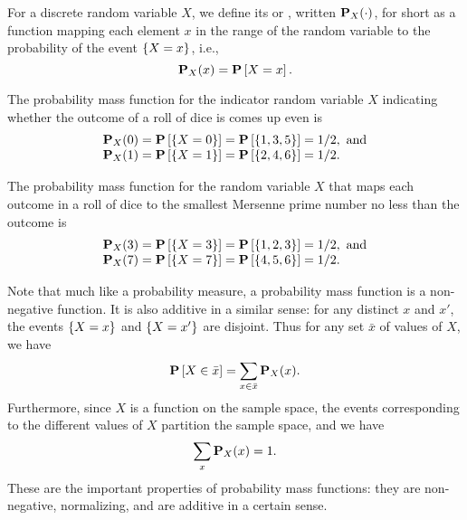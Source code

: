 \begin{flex}
\begin{definition}
For a discrete random variable $X$, we define its  or , written $\mathbf{P}_{X}(\cdot)$, for short as
a function mapping each element $x$ in the range of the random
variable to the probability of the event $\{X =x\}$, i.e.,
\[
\mathbf{P}_{X}(x) = \mathbf{P}\left[{X = x}\right].
\]
\end{definition}

\begin{example}
The probability mass function for the indicator random variable $X$
indicating whether the outcome of a roll of dice is comes up even is 
\[
\begin{array}{lll}
\mathbf{P}_{X}(0) = \mathbf{P}\left[{\{X =0\}}\right] = \mathbf{P}\left[{\{1, 3, 5\}}\right] =
1/2,~\mbox{and}
\\
\mathbf{P}_{X}(1) = \mathbf{P}\left[{\{X =1\}}\right] = \mathbf{P}\left[{\{2, 4, 6\}}\right] =
1/2.
\end{array}
\]

The probability mass function for the random variable $X$
that maps each outcome in a roll of dice to the smallest Mersenne
prime number no less than the outcome is
\[
\begin{array}{lll}
\mathbf{P}_{X}(3) = \mathbf{P}\left[{\{X =3\}}\right] = \mathbf{P}\left[{\{1, 2, 3\}}\right] =
1/2,~\mbox{and}
\\
\mathbf{P}_{X}(7) = \mathbf{P}\left[{\{X =7\}}\right] = \mathbf{P}\left[{\{4, 5, 6\}}\right] =
1/2.
\end{array}
\]
\end{example}
\end{flex}

\begin{gram}
Note that much like a probability measure, a probability mass function is
a non-negative function.
%
It is also additive in a similar sense: for any distinct $x$ and $x'$, the
events $\{X =x\}$ and $\{X =x'\}$ are disjoint.
%
Thus for any set $\bar{x}$ of values of $X$, we have 
\[
\mathbf{P}\left[{X \in \bar{x}}\right] = \sum_{x \in \bar{x}}{\mathbf{P}_{X}(x)}.
\]
%
Furthermore, since $X$ is a function on the sample space, the events
corresponding to the different values of $X$ partition the sample
space, and we have
\[
\sum_{x}{\mathbf{P}_{X}(x)} = 1.
\]
%
These are the important properties of probability mass functions: they
are non-negative, normalizing, and are additive in a certain sense. 
\end{gram}

